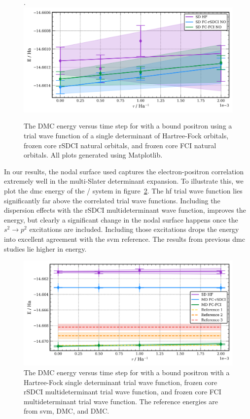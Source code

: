 \begin{figure}
    \caption{\label{fig:be_sd_extrap} The DMC energy versus time step for  with a bound positron using a trial wave function of a single determinant of Hartree-Fock orbitals, frozen core rSDCI natural orbitals, and frozen core FCI natural orbitals. All plots generated using Matplotlib.\cite{10.1109/MCSE.2007.55}}.
    \includegraphics[width=\columnwidth,keepaspectratio]{Images/chapter5/be_extrap_singdet.png}
\end{figure}

In our results, the nodal surface used captures the electron-positron correlation extremely well in the multi-Slater determinant expansion.
To illustrate this, we plot the \gls{dmc} energy of the / system in figure~\ref{fig:be_md_extrap}.
The \gls{hf} trial wave function lies significantly far above the correlated trial wave functions.
Including the dispersion effects with the \gls{rSDCI} multideterminant wave function, improves the energy, but clearly a significant change in the nodal surface happens once the $s^2\rightarrow p^2$ excitations are included.
Including those excitations drops the energy into excellent agreement with the \gls{svm} reference.
The results from previous \gls{dmc} studies lie higher in energy.\cite{10.1021/acs.jctc.1c01193, 10.1063/1.1486447}

\begin{figure}
    \caption{\label{fig:be_md_extrap} The DMC energy versus time step for  with a bound positron with a Hartree-Fock single determinant trial wave function, frozen core rSDCI multideterminant trial wave function, and frozen core FCI multideterminant trial wave function. The reference energies are from \gls{svm}\cite{10.4208/jams.071510.072110a}, DMC\cite{10.1021/acs.jctc.1c01193}, and DMC\cite{10.1063/1.1486447}.
    }
    \includegraphics[width=\columnwidth,keepaspectratio]{Images/chapter5/be_extrap_multidet.png}
\end{figure}

